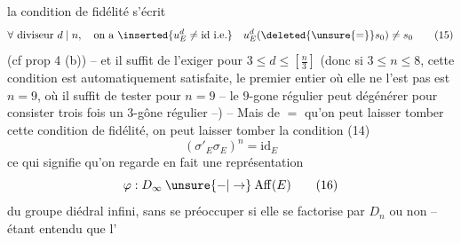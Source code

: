 la condition de fidélité s'écrit
\[
\forall\ \text{diviseur }d\mid n,\quad\text{on a }\inserted{u_E^d\ne\mathrm{id}\ \text{i.e.}}\quad u_E^d(\deleted{\unsure{=}}s_0)\ne s_0
\tag*{(15)}
\]
(cf prop 4 (b)) -- et il suffit \inserted{\text{$=$}} de l'exiger pour $3\leq d\leq\left[\frac n3\right]$ (donc si $3\leq n\leq8$, cette condition est automatiquement satisfaite, le premier entier où elle ne l'est pas est $n=9$, où il suffit de  tester pour $n=9$ -- le $9$-gone régulier peut  dégénérer pour consister trois fois un $3$-gône régulier --) -- Mais de $=$ qu'on peut laisser tomber cette condition de fidélité, on peut laisser tomber la  condition (14)
\[
(\sigma'_E\sigma_E)^{n}=\mathrm{id}_E
\]
ce qui signifie qu'on regarde en fait une représentation
\[
\varphi:D_\infty\mathbin{\unsure{-|\to}}\mathrm{Aff}(E)\tag*{(16)}
\]
du groupe diédral infini, sans se préoccuper si elle se factorise par $D_n$ ou non -- étant entendu que l'
